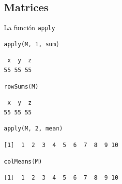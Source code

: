 \documentclass[xcolor={usenames,svgnames,dvipsnames}]{beamer}
\begin{document}
\subsection{Matrices}
\label{sec:orgheadline56}
\begin{frame}[fragile,label={sec:orgheadline55}]{La función \texttt{apply}}
 \lstset{language=R,label= ,caption= ,captionpos=b,numbers=none}
\begin{lstlisting}
apply(M, 1, sum)
\end{lstlisting}

\begin{verbatim}
 x  y  z 
55 55 55
\end{verbatim}

\lstset{language=R,label= ,caption= ,captionpos=b,numbers=none}
\begin{lstlisting}
rowSums(M)
\end{lstlisting}

\begin{verbatim}
 x  y  z 
55 55 55
\end{verbatim}

\lstset{language=R,label= ,caption= ,captionpos=b,numbers=none}
\begin{lstlisting}
apply(M, 2, mean)
\end{lstlisting}

\begin{verbatim}
[1]  1  2  3  4  5  6  7  8  9 10
\end{verbatim}

\lstset{language=R,label= ,caption= ,captionpos=b,numbers=none}
\begin{lstlisting}
colMeans(M)
\end{lstlisting}

\begin{verbatim}
[1]  1  2  3  4  5  6  7  8  9 10
\end{verbatim}
\end{frame}
\end{document}
